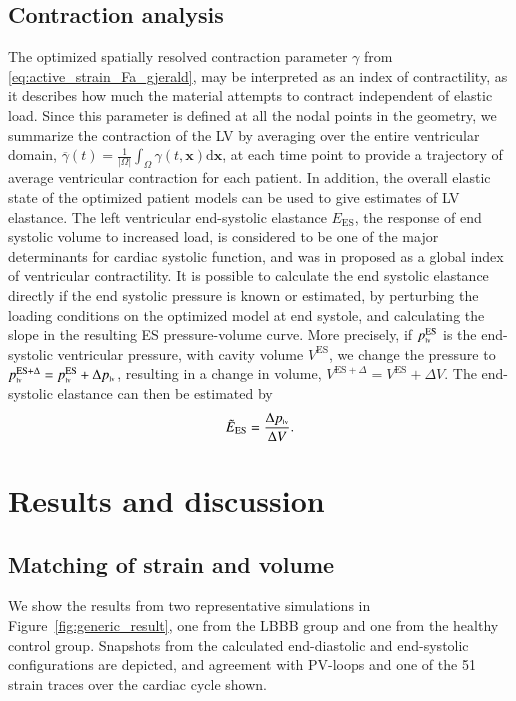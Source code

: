 \documentclass[times]{elsarticle}
\newcommand{\es}{_{\text{ES}}}
\newcommand{\plv}{p_{\textnormal{\tiny{lv}}}}
\begin{document}
\subsection{Contraction analysis}
The optimized spatially resolved contraction parameter $\gamma$ from 
\eqref{eq:active_strain_Fa_gjerald}, may be interpreted as an
index of contractility, as it describes how much the material attempts
to contract independent of elastic load.  Since this parameter is
defined at all the nodal points in the geometry, we summarize the
contraction of the LV by averaging over the entire ventricular 
domain, $ \overline{\gamma}(t) = \frac{1}{|\Omega|} \int_{\Omega}
\gamma (t, \mathbf{x}) \mathrm{d}\mathbf{x}$, at each time point 
to provide a trajectory of average ventricular contraction for
each patient. In addition, the overall elastic state of the optimized patient models
can be used to give estimates of LV elastance. The left ventricular
end-systolic elastance $E\es$, the response of end systolic volume to
increased load, is considered to be one of the major determinants for
cardiac systolic function, and was in \cite{sagawa1977end} proposed
as a global index of ventricular contractility. 
It is possible to calculate the end systolic elastance directly 
if the end systolic pressure is known or estimated, 
by perturbing the loading conditions on the optimized model at end
systole, and calculating the slope in the resulting
ES pressure-volume curve. More precisely, if $\plv^{\text{ES}}$ is the
end-systolic ventricular pressure, with cavity volume $V^{\text{ES}}$,
we change the pressure to $\plv^{\text{ES} + \Delta} =
\plv^{\text{ES}} + \Delta \plv$, resulting in a change in volume,
$V^{\text{ES} +\Delta} = V^{\text{ES}} + \Delta V$. The end-systolic
elastance can then be estimated by 
\begin{align}
  \tilde{E}\es = \frac{\Delta \plv}{\Delta V}.
  \label{eq:estimate_elastance}
\end{align}

\section{Results and discussion}
\label{sec:results}


\subsection{Matching of strain and volume}
We show the results from two representative simulations in
Figure~\ref{fig:generic_result}, one from the LBBB group and one from
the healthy control group. Snapshots from the calculated end-diastolic and
end-systolic configurations are depicted, and agreement with PV-loops
and one of the 51 strain traces over the cardiac cycle shown.  
\end{document}
